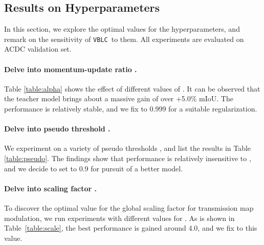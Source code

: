 \documentclass[letterpaper]{article} \usepackage{aaai23}  \usepackage{times}  \usepackage{helvet}  \usepackage{courier}  \usepackage[hyphens]{url}  \usepackage{graphicx} \urlstyle{rm} \def\UrlFont{\rm}  \usepackage{natbib}  \usepackage{caption} \frenchspacing  \setlength{\pdfpagewidth}{8.5in}  \setlength{\pdfpageheight}{11in}  \usepackage{algorithm}
\newcommand{\method}{\texttt{VBLC}~}
\begin{document}
\begin{table}[!htbp]
  \centering
  \caption{Effect of scaling factor .}
  \label{table:scale}
\end{table}

\subsection{Results on Hyperparameters}
\label{sec:parameters}

In this section, we explore the optimal values for the hyperparameters, and remark on the sensitivity of \method to them. All experiments are evaluated on ACDC validation set.

\paragraph{Delve into momentum-update ratio .}
Table \ref{table:alpha} shows the effect of different values of . It can be observed that the teacher model brings about a massive gain of over +5.0\% mIoU. The performance is relatively stable, and we fix  to 0.999 for a suitable regularization.

\paragraph{Delve into pseudo threshold .}
We experiment on a variety of pseudo thresholds , and list the results in Table \ref{table:pseudo}. The findings show that performance is relatively insensitive to , and we decide to set  to 0.9 for pursuit of a better model.

\paragraph{Delve into scaling factor .} To discover the optimal value for the global scaling factor for transmission map modulation, we run experiments with different values for . As is shown in Table~\ref{table:scale}, the best performance is gained around 4.0, and we fix  to this value.
\end{document}
